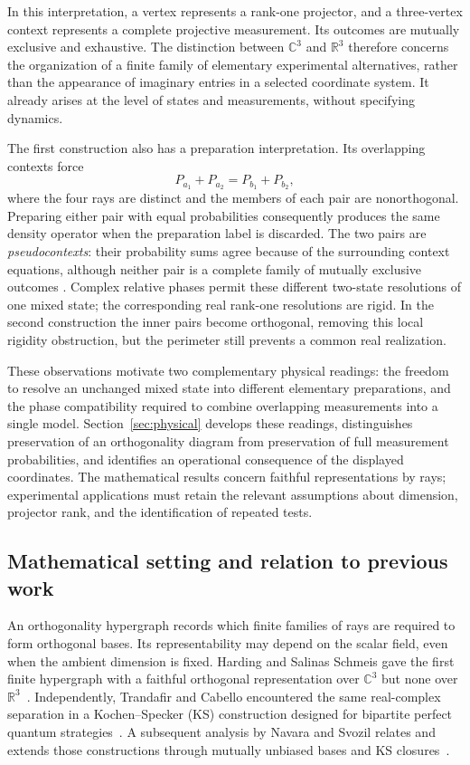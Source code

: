 \documentclass[twocolumn,aps,pra,floatfix,amsmath,amssymb,longbibliography]{revtex4-2}
\theoremstyle{definition}
\theoremstyle{remark}
\newcommand{\C}{\mathbb C}
\newcommand{\R}{\mathbb R}
\begin{document}
In this interpretation, a vertex represents a rank-one projector, and a
three-vertex context represents a complete projective measurement.  Its
outcomes are mutually exclusive and exhaustive.  The distinction between
$\C^3$ and $\R^3$ therefore concerns the organization of a finite family of
elementary experimental alternatives, rather than the appearance of
imaginary entries in a selected coordinate system.  It already arises at
the level of states and measurements, without specifying dynamics.

The first construction also has a preparation interpretation.  Its
overlapping contexts force
\[
 P_{a_1}+P_{a_2}=P_{b_1}+P_{b_2},
\]
where the four rays are distinct and the members of each pair are
nonorthogonal.  Preparing either pair with equal probabilities consequently
produces the same density operator when the preparation label is discarded.
The two pairs are \emph{pseudocontexts}: their probability sums agree
because of the surrounding context equations, although neither pair is a
complete family of mutually exclusive outcomes
\cite{2026-Navara-Svozil-pseudocontexts}.  Complex relative phases permit
these different two-state resolutions of one mixed state; the corresponding
real rank-one resolutions are rigid.  In the second construction the inner
pairs become orthogonal, removing this local rigidity obstruction, but the
perimeter still prevents a common real realization.

These observations motivate two complementary physical readings: the
freedom to resolve an unchanged mixed state into different elementary
preparations, and the phase compatibility required to combine overlapping
measurements into a single model.  Section~\ref{sec:physical} develops these
readings, distinguishes preservation of an orthogonality diagram from
preservation of full measurement probabilities, and identifies an
operational consequence of the displayed coordinates.  The mathematical
results concern faithful representations by rays; experimental applications
must retain the relevant assumptions about dimension, projector rank, and
the identification of repeated tests.

\subsection{Mathematical setting and relation to previous work}

An orthogonality hypergraph records which finite families of rays are required
to form orthogonal bases.  Its representability may depend on the scalar field,
even when the ambient dimension is fixed.  Harding and Salinas Schmeis gave the
first finite hypergraph with a faithful orthogonal representation over $\C^3$
but none over $\R^3$~\cite{harding2025remarksIJTP}.  Independently, Trandafir
and Cabello encountered the same real-complex separation in a
Kochen--Specker (KS) construction designed for bipartite perfect quantum
strategies~\cite{2024-cabello-trandafir0}.  A subsequent analysis by Navara and
Svozil relates and extends those constructions through mutually unbiased bases
and KS closures~\cite{svozil-2025-MYOCHS}.
\end{document}
